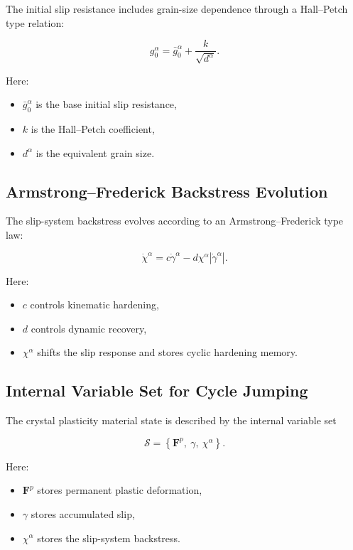 ﻿\documentclass[11pt,a4paper]{article}
\begin{document}
The initial slip resistance includes grain-size dependence through a Hall--Petch type relation:

\[
g_0^{\alpha}
=
\bar{g}_0^{\alpha}
+
\frac{k}{\sqrt{d^{\alpha}}}.
\]

Here:

\begin{itemize}[leftmargin=*]
    \item $\bar{g}_0^{\alpha}$ is the base initial slip resistance,
    \item $k$ is the Hall--Petch coefficient,
    \item $d^{\alpha}$ is the equivalent grain size.
\end{itemize}

\subsection{Armstrong--Frederick Backstress Evolution}

The slip-system backstress evolves according to an Armstrong--Frederick type law:

\[
\dot{\chi}^{\alpha}
=
c\dot{\gamma}^{\alpha}
-
d\chi^{\alpha}
\left|
\dot{\gamma}^{\alpha}
\right|.
\]

Here:

\begin{itemize}[leftmargin=*]
    \item $c$ controls kinematic hardening,
    \item $d$ controls dynamic recovery,
    \item $\chi^{\alpha}$ shifts the slip response and stores cyclic hardening memory.
\end{itemize}

\subsection{Internal Variable Set for Cycle Jumping}

The crystal plasticity material state is described by the internal variable set

\[
\bm{\mathcal{S}}
=
\left\{
\bm{F}^p,\ \gamma,\ \chi^{\alpha}
\right\}.
\]

Here:

\begin{itemize}[leftmargin=*]
    \item $\bm{F}^p$ stores permanent plastic deformation,
    \item $\gamma$ stores accumulated slip,
    \item $\chi^{\alpha}$ stores the slip-system backstress.
\end{itemize}
\end{document}
